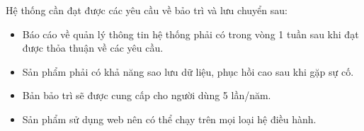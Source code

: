 \documentclass[./../main_file.tex]{subfiles}
\begin{document}
	
	Hệ thống cần đạt được các yêu cầu về bảo trì và lưu chuyển sau:
	
	\begin{itemize}
		\item Báo cáo về quản lý thông tin hệ thống phải có trong vòng 1 tuần sau khi đạt được thỏa thuận về các yêu cầu.
		
		\item Sản phẩm phải có khả năng sao lưu dữ liệu, phục hồi cao sau khi gặp sự cố.
		
		\item Bản bảo trì sẽ được cung cấp cho người dùng 5 lần/năm.
		
		\item Sản phẩm sử dụng web nên có thể chạy trên mọi loại hệ điều hành.		
	\end{itemize}

	
\end{document}
